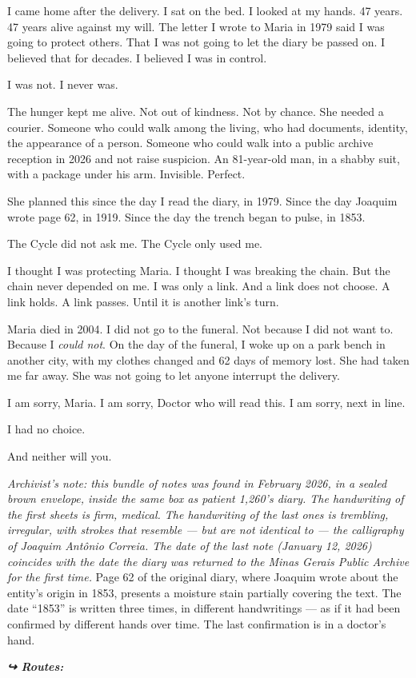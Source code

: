 \noindent I came home after the delivery. I sat on the bed. I looked at my hands. 47 years. 47 years alive against my will. The letter I wrote to Maria in 1979 said I was going to protect others. That I was not going to let the diary be passed on. I believed that for decades. I believed I was in control.

\noindent I was not. I never was.

\noindent The hunger kept me alive. Not out of kindness. Not by chance. She needed a courier. Someone who could walk among the living, who had documents, identity, the appearance of a person. Someone who could walk into a public archive reception in 2026 and not raise suspicion. An 81-year-old man, in a shabby suit, with a package under his arm. Invisible. Perfect.

\noindent She planned this since the day I read the diary, in 1979. Since the day Joaquim wrote page 62, in 1919. Since the day the trench began to pulse, in 1853.

\noindent The Cycle did not ask me. The Cycle only used me.

\noindent I thought I was protecting Maria. I thought I was breaking the chain. But the chain never depended on me. I was only a link. And a link does not choose. A link holds. A link passes. Until it is another link's turn.

\noindent Maria died in 2004. I did not go to the funeral. Not because I did not want to. Because I \textit{could not}. On the day of the funeral, I woke up on a park bench in another city, with my clothes changed and 62 days of memory lost. She had taken me far away. She was not going to let anyone interrupt the delivery.

\noindent I am sorry, Maria. I am sorry, Doctor who will read this. I am sorry, next in line.

\noindent I had no choice.

\noindent And neither will you.

\noindent \textit{Archivist's note: this bundle of notes was found in February 2026, in a sealed brown envelope, inside the same box as patient 1,260's diary. The handwriting of the first sheets is firm, medical. The handwriting of the last ones is trembling, irregular, with strokes that resemble --- but are not identical to --- the calligraphy of Joaquim Antônio Correia. The date of the last note (January 12, 2026) coincides with the date the diary was returned to the Minas Gerais Public Archive for the first time.}
\noindent Page 62 of the original diary, where Joaquim wrote about the entity's origin in 1853, presents a moisture stain partially covering the text. The date \textquotedblleft{}1853\textquotedblright{} is written three times, in different handwritings --- as if it had been confirmed by different hands over time. The last confirmation is in a doctor's hand.

\vspace{0.5em}
\noindent\textit{\textbf{↪ Routes:}  \rotasep {} \rotasep {}}
